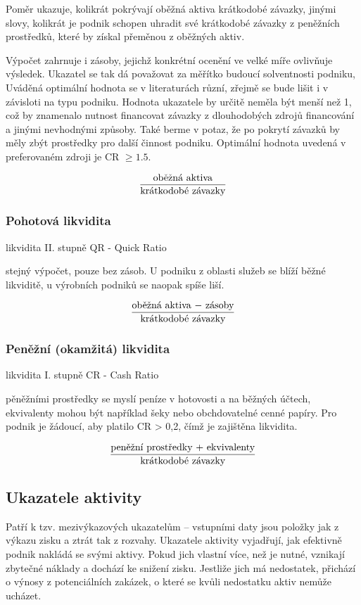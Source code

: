 Poměr ukazuje, kolikrát pokrývají oběžná aktiva krátkodobé závazky, jinými slovy, kolikrát je podnik schopen uhradit své krátkodobé závazky z peněžních prostředků, které by získal přeměnou z oběžných aktiv.

Výpočet zahrnuje i zásoby, jejichž konkrétní ocenění ve velké míře ovlivňuje výsledek.
Ukazatel se tak dá považovat za měřítko budoucí solventnosti podniku, Uváděná optimální hodnota se v literaturách různí, zřejmě se bude lišit i v závisloti na typu podniku. Hodnota ukazatele by určitě neměla být menší než 1, což by znamenalo nutnost financovat závazky z dlouhodobých zdrojů financování a jinými nevhodnými způsoby. Také berme v potaz, že po pokrytí závazků by měly zbýt prostředky pro další činnost podniku.
Optimální hodnota uvedená v preferovaném zdroji je CR $\geq 1.5$. 

$$\dfrac{\text{oběžná aktiva}}{\text{krátkodobé závazky}}$$

\subsubsection{Pohotová likvidita} 
likvidita II. stupně
QR - Quick Ratio

stejný výpočet, pouze bez zásob. U podniku z oblasti služeb se blíží běžné likviditě, u výrobních podniků se naopak spíše liší.

$$\dfrac{\text{oběžná aktiva $-$ zásoby}}{\text{krátkodobé závazky}}$$

\subsubsection{Peněžní (okamžitá) likvidita}
likvidita I. stupně
CR - Cash Ratio

pěněžními prostředky se myslí peníze v hotovosti a na běžných účtech, ekvivalenty mohou být například šeky nebo obchdovatelné cenné papíry. Pro podnik je žádoucí, aby platilo CR > 0,2, čímž je zajištěna likvidita.

$$\dfrac{\text{peněžní prostředky $+$ ekvivalenty}}{\text{krátkodobé závazky}}$$








\subsection{Ukazatele aktivity}
Patří k tzv. mezivýkazových ukazatelům -- vstupními daty jsou položky jak z výkazu zisku a ztrát tak z rozvahy. Ukazatele aktivity vyjadřují, jak efektivně podnik nakládá se svými aktivy. Pokud jich vlastní více, než je nutné, vznikají zbytečné náklady a dochází ke snižení zisku. Jestliže jich má nedostatek, přichází o výnosy z potenciálních zakázek, o které se kvůli nedostatku aktiv nemůže ucházet.


